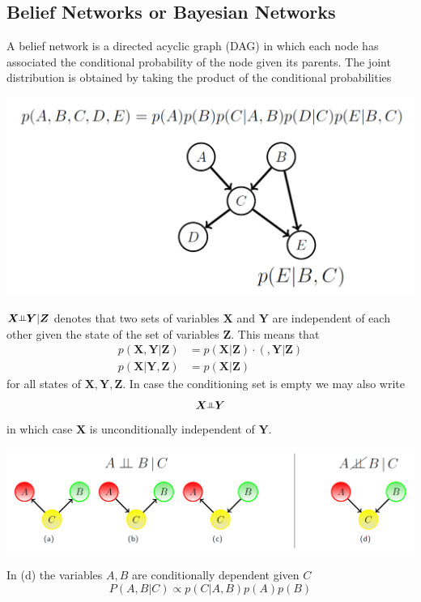 \documentclass[11pt]{article}
\theoremstyle{definition}
\newcommand{\incond}{\rotatebox[origin=c]{90}{$\vDash$}}
\begin{document}
\subsection{Belief Networks or Bayesian Networks}
A belief network is a directed acyclic graph (DAG) in which each node has associated the conditional probability of the node given its parents. The joint distribution is obtained by taking the product of the conditional probabilities
\begin{center}
	\includegraphics[width=0.7\linewidth]{img/belief_network}
\end{center}
$ \bm{X} \incond \bm{Y} | \bm{Z}$ denotes that two sets of variables $\bm{X}$ and $\bm{Y}$ are independent of each other given the state of the set of variables $\bm{Z}$. This means that
\begin{align*}
	p(\bm{X},\bm{Y}|\bm{Z}) &= p(\bm{X}|\bm{Z})\cdotp(,\bm{Y}|\bm{Z})\\
	p(\bm{X}|\bm{Y},\bm{Z}) &= p(\bm{X}|\bm{Z})
\end{align*}
for all states of $\bm{X},\bm{Y},\bm{Z}$. In case the conditioning set is empty we may also write
\begin{equation*}
	\bm{X} \incond \bm{Y}
\end{equation*}
in which case $\bm{X}$ is unconditionally independent of $\bm{Y}$.
\begin{center}
	\includegraphics[width=0.7\linewidth]{img/conditional_independence}
\end{center}
In (d) the variables $A,B$ are conditionally dependent given $C$
\begin{equation*}
	P(A,B|C) \propto p(C|A,B)p(A)p(B)
\end{equation*}
\end{document}
